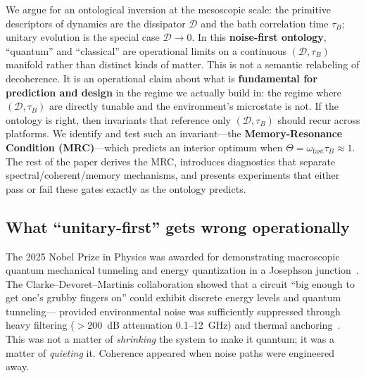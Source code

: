 \documentclass[11pt,letterpaper]{article}
\begin{document}
We argue for an ontological inversion at the mesoscopic scale: the
primitive descriptors of dynamics are the dissipator $\mathcal{D}$ and the
bath correlation time $\tau_B$; unitary evolution is the special case
$\mathcal{D}\to 0$. In this \textbf{noise-first ontology}, ``quantum'' and
``classical'' are operational limits on a continuous
$(\mathcal{D},\tau_B)$ manifold rather than distinct kinds of matter. This
is not a semantic relabeling of decoherence. It is an operational claim
about what is \textbf{fundamental for prediction and design} in the regime
we actually build in: the regime where $(\mathcal{D},\tau_B)$ are directly
tunable and the environment's microstate is not. If the ontology is right,
then invariants that reference only $(\mathcal{D},\tau_B)$ should recur
across platforms. We identify and test such an invariant—the
\textbf{Memory-Resonance Condition (MRC)}—which predicts an interior
optimum when $\Theta=\omega_{\mathrm{fast}}\tau_B\approx 1$. The rest of
the paper derives the MRC, introduces diagnostics that separate
spectral/coherent/memory mechanisms, and presents experiments that either
pass or fail these gates exactly as the ontology predicts.

\subsection{What ``unitary-first'' gets wrong operationally}

The 2025 Nobel Prize in Physics was awarded for demonstrating macroscopic
quantum mechanical tunneling and energy quantization in a Josephson
junction~\cite{nobel_background_2025}. The Clarke--Devoret--Martinis
collaboration showed that a circuit ``big enough to get one's grubby
fingers on'' could exhibit discrete energy levels and quantum tunneling—
provided environmental noise was sufficiently suppressed through heavy
filtering ($>200$~dB attenuation 0.1--12~GHz) and thermal
anchoring~\cite{martinis1985_energy,devoret1985_mqt}. This was not a
matter of \emph{shrinking} the system to make it quantum; it was a matter
of \emph{quieting} it. Coherence appeared when noise paths were
engineered away.
\end{document}
